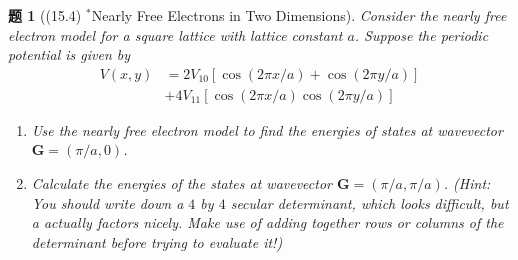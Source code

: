 \documentclass[UTF8,10pt,a4paper]{article}
\theoremstyle{Problem}
\newtheorem{prob}{题}
\theoremstyle{Solution}
\begin{document}
\begin{prob}[(15.4) $^*$Nearly Free Electrons in Two Dimensions]
    Consider the nearly free electron model for a square lattice with lattice constant $a$. Suppose the periodic potential is given by
    \begin{align*}
        V(x,y)&=2V_{10}[\cos(2\pi x/a)+\cos(2\pi y/a)]\\
        &+4V_{11}[\cos(2\pi x/a)\cos(2\pi y/a)]
    \end{align*}
    \begin{enumerate}
        \item[(a)] Use the nearly free electron model to find the energies of states at wavevector $\bm{G}=(\pi/a,0)$.
        \item[(b)] Calculate the energies of the states at wavevector $\bm{G}=(\pi/a,\pi/a)$. (Hint: You should write down a $4$ by $4$ secular determinant, which looks difficult, but a actually factors nicely. Make use of adding together rows or columns of the determinant before trying to evaluate it!)
    \end{enumerate}
\end{prob}
\end{document}
